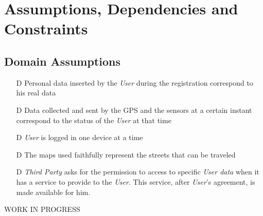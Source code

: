 \documentclass[../../rasd.tex]{subfiles}
\begin{document}
\section{Assumptions, Dependencies and Constraints}
		\subsection{Domain Assumptions}
			 	\begin{itemize}
				 	\item[D\subs{1}]Personal data inserted by the \textit{User} during the registration correspond to his real data
					\item[D\subs{2}]Data collected and sent by the GPS and the sensors at a certain instant correspond to the status of the \textit{User} at that time
				
					\item[D\subs{3}]\textit{User} is logged in one device at a time

					\item[D\subs{4}]The maps used faithfully represent the streets that can be traveled
					\item[D\subs{5}]\textit{Third Party} asks for the permission to access to specific \textit{User data} when it has a service to provide to the \textit{User}. This service, after \textit{User}'s agreement, is made available for him.
				
				\end{itemize}
		WORK IN PROGRESS
		
\end{document}
